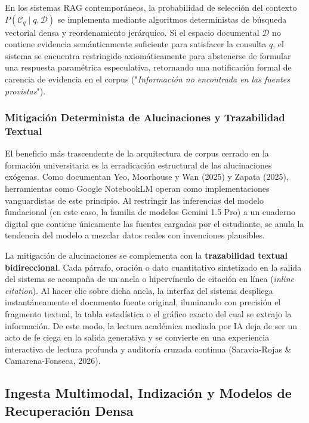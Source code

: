 En los sistemas RAG contemporáneos, la probabilidad de selección del contexto $P(\mathcal{C}_q \mid q, \mathcal{D})$ se implementa mediante algoritmos deterministas de búsqueda vectorial densa y reordenamiento jerárquico. Si el espacio documental $\mathcal{D}$ no contiene evidencia semánticamente suficiente para satisfacer la consulta $q$, el sistema se encuentra restringido axiomáticamente para abstenerse de formular una respuesta paramétrica especulativa, retornando una notificación formal de carencia de evidencia en el corpus ("\textit{Información no encontrada en las fuentes provistas}").

\subsubsection{Mitigación Determinista de Alucinaciones y Trazabilidad Textual}

El beneficio más trascendente de la arquitectura de corpus cerrado en la formación universitaria es la erradicación estructural de las alucinaciones exógenas. Como documentan Yeo, Moorhouse y Wan (2025) y Zapata (2025), herramientas como Google NotebookLM operan como implementaciones vanguardistas de este principio. Al restringir las inferencias del modelo fundacional (en este caso, la familia de modelos Gemini 1.5 Pro) a un cuaderno digital que contiene únicamente las fuentes cargadas por el estudiante, se anula la tendencia del modelo a mezclar datos reales con invenciones plausibles.

La mitigación de alucinaciones se complementa con la \textbf{trazabilidad textual bidireccional}. Cada párrafo, oración o dato cuantitativo sintetizado en la salida del sistema se acompaña de un ancla o hipervínculo de citación en línea (\textit{inline citation}). Al hacer clic sobre dicha ancla, la interfaz del sistema despliega instantáneamente el documento fuente original, iluminando con precisión el fragmento textual, la tabla estadística o el gráfico exacto del cual se extrajo la información. De este modo, la lectura académica mediada por IA deja de ser un acto de fe ciega en la salida generativa y se convierte en una experiencia interactiva de lectura profunda y auditoría cruzada continua (Saravia-Rojas \& Camarena-Fonseca, 2026).

\vspace{0.4cm}

\subsection{Ingesta Multimodal, Indización y Modelos de Recuperación Densa}

